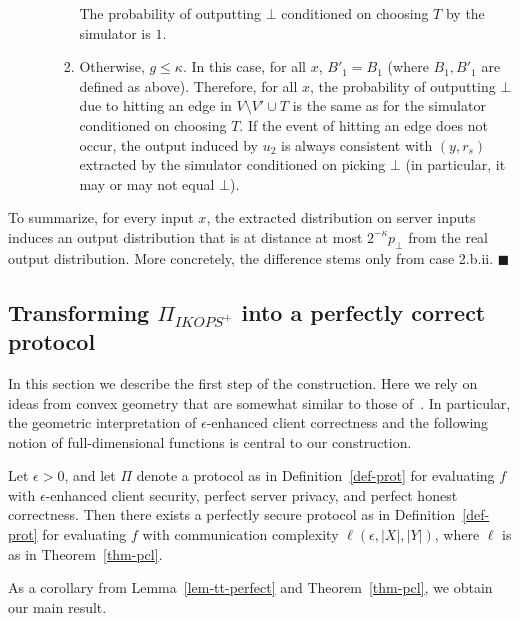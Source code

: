 \documentclass{llncs}
\begin{document}
\begin{enumerate}
\begin{enumerate}
\begin{enumerate}
		The probability of outputting $\bot$ conditioned on choosing $T$ by the simulator is $1$. 
		\item Otherwise, $g\leq \kappa$. In this case, for all $x$, $B'_1=B_1$ (where $B_1,B'_1$ are defined as above). Therefore, for all $x$, the probability of outputting $\bot$ due to hitting an edge in $V\setminus{V'}\cup T$ is the same as for the simulator conditioned on choosing $T$. If the event of hitting an edge does not occur, the output induced by $u_2$ is always consistent with $(y,r_s)$ extracted by the simulator conditioned on picking $\bot$ (in particular, it may or may not equal $\bot$). 
\end{enumerate}
 	\end{enumerate}
\end{enumerate}

To summarize, for every input $x$, the extracted distribution on server inputs induces an output distribution that is at distance at most $2^{-\kappa}p_\bot$ from the real output distribution. More concretely, the difference stems only from case 2.b.ii.\hspace*{240pt} $\blacksquare$


\subsection{Transforming $\Pi_{IKOPS^+}$ into a perfectly correct protocol}

In this section we describe the first step of the construction.
Here we rely on ideas from convex geometry that are somewhat similar to those of~\cite{Ash14}. In particular, the geometric interpretation of $\epsilon$-enhanced client correctness and the following notion of full-dimensional functions is central to our construction.


\begin{lemma}\label{lem-tt-perfect}
	Let $\epsilon>0$, and let $\Pi$ denote a protocol as in Definition~\ref{def-prot} for evaluating $f$ with $\epsilon$-enhanced client security, perfect server privacy, and perfect honest correctness. Then there exists a perfectly secure protocol as in Definition~\ref{def-prot} for evaluating $f$ with communication complexity $\ell(\epsilon,|X|,|Y|)$, where $\ell$ is as in Theorem~\ref{thm-pcl}. 
\end{lemma}

As a corollary from Lemma~\ref{lem-tt-perfect} and Theorem~\ref{thm-pcl}, we obtain our main result.
\end{document}
